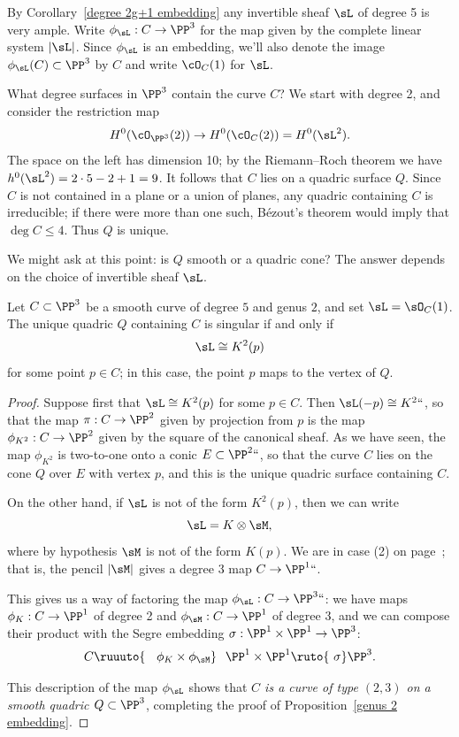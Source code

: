 By Corollary~\ref{degree 2g+1 embedding} any invertible sheaf $\sL$ of
%
%
degree 5 is very ample.
Write $\phi_\sL : C \to \PP^3$
for the map given by the complete linear
system $|\sL|$. Since $\phi_\sL$ is an embedding, we'll also denote the
image $\phi_\sL(C) \subset \PP^3$ by $C$ and write $\cO_C(1)$ for $\sL$.

What degree surfaces in $\PP^3$ contain the curve $C$? We start with
degree 2, and consider the restriction map
$$
H^0(\cO_{\PP^3}(2)) \to H^0(\cO_C(2)) = H^0(\sL^2).
$$
The space on the left has dimension 10; by the
Riemann--Roch theorem
%
we have $h^0(\sL^2) = 2\cdot5 - 2 + 1 = 9$. It follows that $C$ lies
on a quadric surface $Q$. Since $C$ is not contained in a plane or a
union of planes, any quadric containing $C$ is irreducible; if there
were more than one such,
B\'ezout's theorem
%
 would imply that $\deg C
\leq 4$. Thus $Q$ is unique.

We might ask at this point: is $Q$ smooth or a quadric cone? The answer
depends on the choice of invertible sheaf $\sL$.

\begin{proposition}
\label{genus 2 embedding}
Let $C \subset \PP^3$ be a smooth curve of degree $5$ and genus $2$, and
set $\sL = \sO_C(1)$. The unique quadric $Q$ containing $C$
  is singular if and only if
$$
\sL \cong K^2(p)
$$
for some point $p \in C$; in this case, the point $p$ maps to the vertex
of $Q$.
\end{proposition}

\begin{proof}

Suppose first that
$\sL \cong K^2(p)$ for some $p \in
C$. Then $\sL(-p) \cong K^2` `$, so that the map $\pi : C \to \PP^2$ given
by projection from $p$ is the map $\phi_{K^2} : C \to \PP^2$ given by
the square of the canonical sheaf. As we have seen, the map $\phi_{K^2}$
is two-to-one onto a conic $E \subset \PP^2` `$, so that the curve $C$
lies on the cone $Q$ over $E$ with vertex $p$, and this is the unique
quadric surface containing $C$.

On the other hand, if $\sL$ is not of the form $K^2(p)$, then we can write
$$
\sL = K \otimes \sM,
$$
where by hypothesis $\sM$ is not of the form $K(p)$.
We are in case (2) on page~\pageref{genus 2 pencil}; that is,
the pencil $|\sM|$ gives a
degree 3 map $C \to \PP^1` `$.

This gives us a way of factoring the map $\phi_\sL : C \to \PP^3` `$: we
have maps $\phi_K : C \to \PP^1$ of degree 2 and $\phi_\sM : C \to \PP^1$
of degree 3, and we can compose their product with the
Segre embedding
%
$\sigma : \PP^1 \times \PP^1 \to \PP^3$:
$$
C\ruuuto {\hskip0.9em\phi_K \times \phi_\sM}\hskip0.7em
\PP^1 \times \PP^1  \ruto {\ \sigma}  \PP^3.
$$

This description of the map $\phi_\sL$  shows  that \emph{$C$ is a
curve of type $(2,3)$
%
on a smooth quadric $Q \subset \PP^3$}, completing the
proof of Proposition~\ref{genus 2 embedding}.
\end{proof}
 
